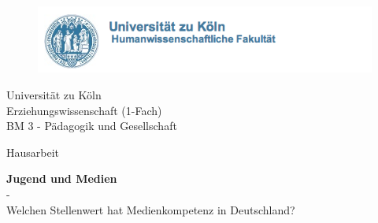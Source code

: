 \begin{titlepage}



\begin{figure}[!ht]
	\centering
		\includegraphics[natwidth=920pt, natheight=95pt, width=1.0\textwidth]{Bilder/LogoUni.png}


\end{figure}

\begin{center}

\vspace{0,8cm}

\begin{large}
Universität zu Köln\\
Erziehungswissenschaft (1-Fach)\\
BM 3 - Pädagogik und Gesellschaft\\
\vspace{1,2cm}
\begin{scshape}
Hausarbeit\\ 
\end{scshape}
\end{large}


\vspace{1.2cm}

\begin{rmfamily}
\textbf{\huge Jugend und Medien}\\
\LARGE -\\
	Welchen Stellenwert hat Medienkompetenz in Deutschland?\\
\normalsize
\end{rmfamily}

\vspace{1.7cm}
%


\end{center}
\end{titlepage}
